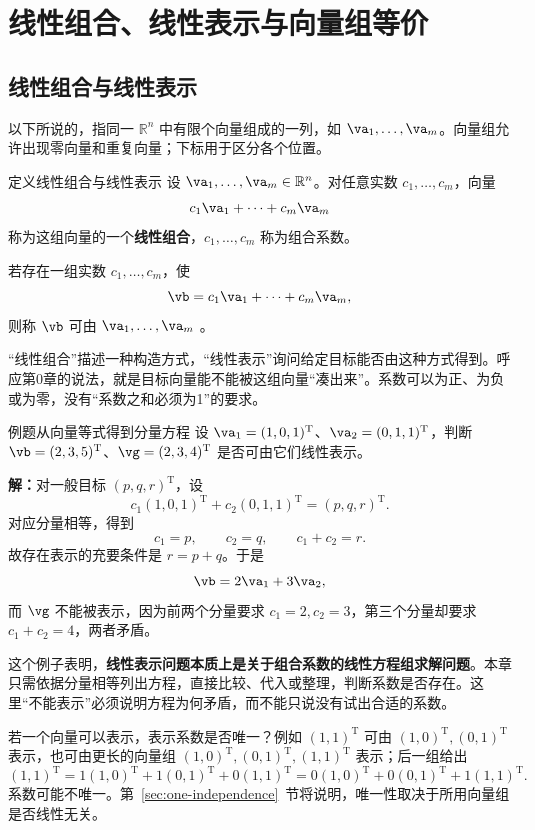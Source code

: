 \documentclass[a4paper,12pt,twoside,openany,fontset=none]{ctexbook}
\newcounter{definition}[chapter]
\newenvironment{definition}[1][]{\begin{defBox}{定义}{#1}}{\end{defBox}}
\newcounter{example}[chapter]
\newenvironment{example}[1][]{\begin{exBox}{例题}{#1}}{\end{exBox}}
\numberwithin{equation}{chapter}
\begin{document}
\section{线性组合、线性表示与向量组等价}
\label{sec:one-combinations}

\subsection*{线性组合与线性表示}

以下所说的\textbf{}，指同一 $\mathbb{R}^n$ 中有限个向量组成的一列，如 $\va_1,\ldots,\va_m$。向量组允许出现零向量和重复向量；下标用于区分各个位置。

\begin{definition}[线性组合与线性表示]
设 $\va_1,\ldots,\va_m\in\mathbb{R}^n$。对任意实数 $c_1,\ldots,c_m$，向量
\[
    c_1\va_1+\cdots+c_m\va_m
\]
称为这组向量的一个\textbf{线性组合}，$c_1,\ldots,c_m$ 称为组合系数。

若存在一组实数 $c_1,\ldots,c_m$，使
\[
    \vb=c_1\va_1+\cdots+c_m\va_m,
\]
则称 $\vb$ 可由 $\va_1,\ldots,\va_m$ \textbf{}。
\end{definition}

“线性组合”描述一种构造方式，“线性表示”询问给定目标能否由这种方式得到。呼应第0章的说法，就是目标向量能不能被这组向量“凑出来”。系数可以为正、为负或为零，没有“系数之和必须为1”的要求。

\begin{example}[从向量等式得到分量方程]
设 $\va_1=(1,0,1)^{\mathrm T}$、$\va_2=(0,1,1)^{\mathrm T}$，判断 $\vb=(2,3,5)^{\mathrm T}$、$\vg=(2,3,4)^{\mathrm T}$ 是否可由它们线性表示。

\textbf{解：}对一般目标 $(p,q,r)^{\mathrm T}$，设
\[
    c_1(1,0,1)^{\mathrm T}+c_2(0,1,1)^{\mathrm T}=(p,q,r)^{\mathrm T}.
\]
对应分量相等，得到
\[
    c_1=p,\qquad c_2=q,\qquad c_1+c_2=r.
\]
故存在表示的充要条件是 $r=p+q$。于是
\[
    \vb=2\va_1+3\va_2,
\]
而 $\vg$ 不能被表示，因为前两个分量要求 $c_1=2,c_2=3$，第三个分量却要求 $c_1+c_2=4$，两者矛盾。
\end{example}

这个例子表明，\textbf{线性表示问题本质上是关于组合系数的线性方程组求解问题}。本章只需依据分量相等列出方程，直接比较、代入或整理，判断系数是否存在。这里“不能表示”必须说明方程为何矛盾，而不能只说没有试出合适的系数。

若一个向量可以表示，表示系数是否唯一？例如 $(1,1)^{\mathrm T}$ 可由 $(1,0)^{\mathrm T},(0,1)^{\mathrm T}$ 表示，也可由更长的向量组 $(1,0)^{\mathrm T},(0,1)^{\mathrm T},(1,1)^{\mathrm T}$ 表示；后一组给出
\[
    (1,1)^{\mathrm T}=1(1,0)^{\mathrm T}+1(0,1)^{\mathrm T}+0(1,1)^{\mathrm T}
          =0(1,0)^{\mathrm T}+0(0,1)^{\mathrm T}+1(1,1)^{\mathrm T}.
\]
系数可能不唯一。第~\ref{sec:one-independence}~节将说明，唯一性取决于所用向量组是否线性无关。
\end{document}
